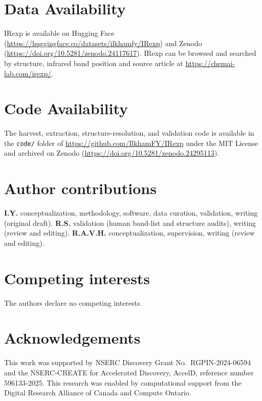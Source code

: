 \documentclass[pdflatex,sn-nature]{sn-jnl}
\begin{document}
\FloatBarrier
\section{Data Availability}\label{sec:dataavail}

IRexp is available on Hugging Face (\url{https://huggingface.co/datasets/ilkhamfy/IRexp})
and Zenodo (\url{https://doi.org/10.5281/zenodo.24117617}).
IRexp can be browsed and searched by structure, infrared band position and source article at \url{https://chemai-lab.com/irexp/}.

\section{Code Availability}\label{sec:codeavail}

The harvest, extraction, structure-resolution, and validation code is available in the
\texttt{code/} folder of \url{https://github.com/IlkhamFY/IRexp} under the MIT License
and archived on Zenodo (\url{https://doi.org/10.5281/zenodo.24295113}).

\section*{Author contributions}

\textbf{I.Y.} conceptualization, methodology, software, data curation, validation,
writing (original draft).
\textbf{R.S.} validation (human band-list and structure audits), writing (review and editing).
\textbf{R.A.V.H.} conceptualization, supervision, writing (review and editing).

\section*{Competing interests}

The authors declare no competing interests.

\section*{Acknowledgements}

This work was supported by NSERC Discovery Grant No.~RGPIN-2024-06594
and the NSERC-CREATE for Accelerated Discovery, AccelD, reference number 596133-2025.
This research was enabled by computational support from the Digital Research Alliance of Canada and Compute Ontario.



\end{document}
